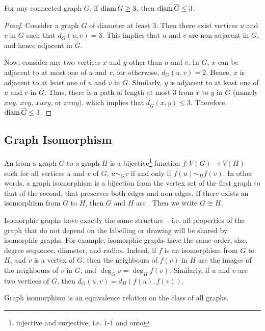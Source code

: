 \begin{Theorem}\label{thm:Diam>=3}
For any connected graph $G$, if $\operatorname{diam} G \ge 3$, then $\operatorname{diam} \overline G \le 3$.
\end{Theorem}

\begin{proof}
Consider a graph $G$ of diameter at least $3$. Then there exist vertices $u$ and $v$ in $G$ such that $d_G(u, v) = 3$. This implies that $u$ and $v$ are non-adjacent in $G$, and hence adjacent in $\overline G$.

Now, consider any two vertices $x$ and $y$ other than $u$ and $v$. In $G$, $x$ can be adjacent to at most one of $u$ and $v$, for otherwise, $d_G(u,v) = 2$. Hence, $x$ is adjacent to at least one of $u$ and $v$ in $\overline G$. Similarly, $y$ is adjacent to at least one of $u$ and $v$ in $\overline G$. Thus, there is a path of length at most $3$ from $x$ to $y$ in $\overline G$ (namely $xuy$, $xvy$, $xuvy$, or $xvuy$), which implies that $d_{\overline G}(x, y) \le 3$. Therefore, $\operatorname{diam} \overline G \le 3$.
\end{proof}

\subsection{Graph Isomorphism}\label{subsec:Isomorphism}

An  from a graph $G$ to a graph $H$ is a bijective\footnote{injective and surjective; i.e. $1$-$1$ and onto} function $f \colon V(G) \to V(H)$ such for all vertices $u$ and $v$ of $G$, $u \sim_G v$ if and only if $f(u) \sim_H f(v)$. In other words, a graph isomorphism is a bijection from the vertex set of the first graph to that of the second, that preserves both edges and non-edges. If there exists an isomorphism from $G$ to $H$, then $G$ and $H$ are . Then we write $G \cong H$.

Isomorphic graphs have exactly the same structure -- i.e. all properties of the graph that do not depend on the labelling or drawing will be shared by isomorphic graphs. For example, isomorphic graphs have the same order, size, degree sequence, diameter, and radius. Indeed, if $f$ is an isomorphism from $G$ to $H$, and $v$ is a vertex of $G$, then the neighbours of $f(v)$ in $H$ are the images of the neighbours of $v$ in $G$, and $\deg_G v = \deg_H f(v)$. Similarly, if $u$ and $v$ are two vertices of $G$, then $d_G(u, v) = d_H(f(u), f(v))$.

\begin{Theorem}
Graph isomorphism is an equivalence relation on the class of all graphs.
\end{Theorem}

